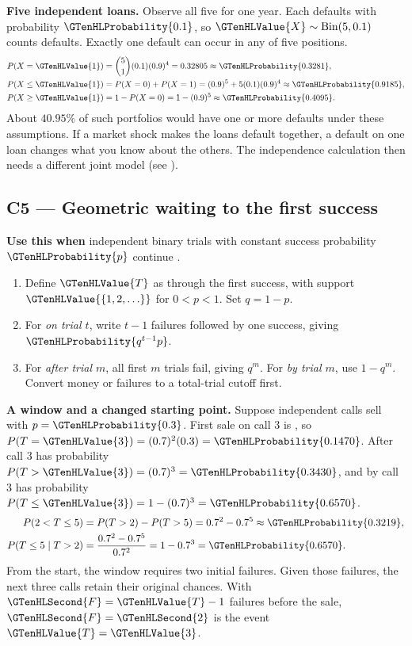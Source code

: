 \textbf{Five independent loans.} Observe all five for one year. Each defaults with probability \(\GTenHLProbability{0.1}\), so \(\GTenHLValue{X}\sim\operatorname{Bin}(5,0.1)\) counts defaults. Exactly one default can occur in any of five positions.
\[
\begin{aligned}
P(X=\GTenHLValue{1})&=\binom51(0.1)(0.9)^4=0.32805\approx\GTenHLProbability{0.3281},\\
P(X\leq\GTenHLValue{1})&=P(X=0)+P(X=1)=(0.9)^5+5(0.1)(0.9)^4\approx\GTenHLProbability{0.9185},\\
P(X\geq\GTenHLValue{1})&=1-P(X=0)=1-(0.9)^5\approx\GTenHLProbability{0.4095}.
\end{aligned}
\]
About \(40.95\%\) of such portfolios would have one or more defaults under these assumptions. If a market shock makes the loans default together, a default on one loan changes what you know about the others. The independence calculation then needs a different joint model (see ).
\par\nobreak
{}

\newpage
\subsection{C5 --- Geometric waiting to the first success}\label{crit:C5}
\textbf{Use this when} independent binary trials with constant success probability \(\GTenHLProbability{p}\) continue .

\begin{enumerate}
\item Define \(\GTenHLValue{T}\) as  through the first success, with support \(\GTenHLValue{\{1,2,\ldots\}}\) for \(0<p<1\). Set \(q=1-p\).
\item For \emph{on trial \(t\)}, write \(t-1\) failures followed by one success, giving \(\GTenHLProbability{q^{t-1}p}\).
\item For \emph{after trial \(m\)}, all first \(m\) trials fail, giving \(q^m\). For \emph{by trial \(m\)}, use \(1-q^m\). Convert money or failures to a total-trial cutoff first.
\end{enumerate}

\textbf{A window and a changed starting point.} Suppose independent calls sell with \(p=\GTenHLProbability{0.3}\). First sale on call 3 is , so \(P(T=\GTenHLValue{3})=(0.7)^2(0.3)=\GTenHLProbability{0.1470}\). After call 3 has probability \(P(T>\GTenHLValue{3})=(0.7)^3=\GTenHLProbability{0.3430}\), and by call 3 has probability \(P(T\leq\GTenHLValue{3})=1-(0.7)^3=\GTenHLProbability{0.6570}\).
\[
\begin{aligned}
P(2<T\leq5)&=P(T>2)-P(T>5)=0.7^2-0.7^5\approx\GTenHLProbability{0.3219},\\
P(T\leq5\mid T>2)&=\frac{0.7^2-0.7^5}{0.7^2}=1-0.7^3=\GTenHLProbability{0.6570}.
\end{aligned}
\]
From the start, the window requires two initial failures. Given those failures, the next three calls retain their original chances. With \(\GTenHLSecond{F}=\GTenHLValue{T}-1\) failures before the sale, \(\GTenHLSecond{F}=\GTenHLSecond{2}\) is the event \(\GTenHLValue{T}=\GTenHLValue{3}\).

